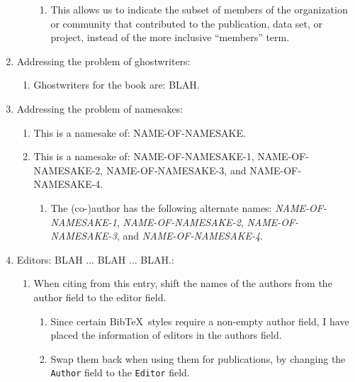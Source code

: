 \documentclass[letter,12pt]{article}
\begin{document}
\begin{enumerate}
\begin{enumerate}
		\begin{enumerate} \itemsep -2pt
		\item This allows us to indicate the subset of members of the organization or community that contributed to the publication, data set, or project, instead of the more inclusive ``members'' term.
		\end{enumerate}
	\end{enumerate}
\item Addressing the problem of ghostwriters: \vspace{-0.3cm}
	\begin{enumerate} \itemsep -2pt
	\item Ghostwriters for the book are: BLAH.
	\end{enumerate}
\item Addressing the problem of namesakes: \vspace{-0.3cm}
	\begin{enumerate} \itemsep -2pt
	\item This is a namesake of: NAME-OF-NAMESAKE.
	\item This is a namesake of: NAME-OF-NAMESAKE-1, NAME-OF-NAMESAKE-2, NAME-OF-NAMESAKE-3, and NAME-OF-NAMESAKE-4. \vspace{-0.2cm}
		\begin{enumerate} \itemsep -2pt
		\item The (co-)author has the following alternate names: {\it NAME-OF-NAMESAKE-1}, {\it NAME-OF-NAMESAKE-2}, {\it NAME-OF-NAMESAKE-3}, and {\it NAME-OF-NAMESAKE-4}.
		\end{enumerate}
	\end{enumerate}
\item Editors: BLAH ... BLAH ... BLAH.: \vspace{-0.3cm}
	\begin{enumerate} \itemsep -2pt
	\item When citing from this entry, shift the names of the authors from the author field to the editor field. \vspace{-0.2cm}
		\begin{enumerate} \itemsep -2pt
		\item Since certain {\sc Bib}\TeX\ styles require a non-empty author field, I have placed the information of editors in the authors field. 
		\item Swap them back when using them for publications, by changing the {\tt Author} field to the {\tt Editor} field.

\end{enumerate}
\end{enumerate}
\end{enumerate}
\end{document}
